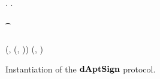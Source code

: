 \begin{figure}
\begin{center}
{\begin{varwidth}{\textwidth}
{            \< \sendmessageleft*[3cm]{\varSigFin} \< \\
            \varPubKey \opFunResult \varSigContext.\varPubKey \< \< \varPubKey \opFunResult \varSigContext.\varPubKey \\
            \pcif \procVerf{\varMsg}{\varSigFin}{\varPubKey}  \\
            \t \pcreturn \cnstFalsum \\
            \varWit \opFunResult \procExtWit{\varSigFin}{\varSigAlice}{\varSigAptBob} \\
            \pcreturn (\varWit, (\varSigFin, \varPubKey)) \< \< \pcreturn (\varSigFin, \varPubKey)
            }
        \end{varwidth}
        }
    \end{center}
    \caption{Instantiation of the $\mathbf{dAptSign}$ protocol.} \label{fig:sig:daptsign}
\end{figure}